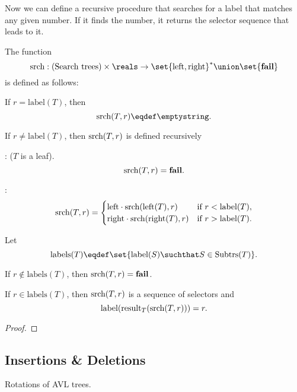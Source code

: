 Now we can define a recursive procedure that searches for a label that
matches any given number.  If it finds the number, it returns the
selector sequence that leads to it.

\begin{definition}

The function
\[
\srchtr{}: \text{(Search trees)} \times \reals \to \set{\leftsub{},\rightsub{}}^* \union \set{\textbf{fail}}
\]
is defined as follows:

If $r = \text{label}(T)$, then
\[
\srchtr{(T,r)} \eqdef \emptystring.
\]

If $r \neq \text{label}(T)$, then $\text{srch}(T,r)$ is defined recursively

: ($T$ is a leaf).
\[
\text{srch}(T,r) = \textbf{fail}.
\]

:
\[
\text{srch}(T,r) = \begin{cases} 
\text{left}\cdot \text{srch}(\text{left}(T),r) & \text{if $r < \text{label}(T)$},\\
\text{right}\cdot \text{srch}(\text{right}(T),r) & \text{if $r > \text{label}(T)$}.
\end{cases}
\]
\end{definition}

\begin{theorem}
Let
\[
\text{labels}(T) \eqdef \set{\text{label}(S) \suchthat S \in \subbrn{T}}.
\]

If $r \notin \text{labels}(T)$, then $\text{srch}(T,r) = \textbf{fail}$.  

If $r \in \text{labels}(T)$, then $\text{srch}(T,r)$ is a sequence of
selectors and
\[
\text{label}(\text{result}_{T}(\text{srch}(T,r))) = r.
\]
\end{theorem}

\begin{proof}


\end{proof}

\subsection{Insertions \& Deletions}

Rotations of AVL trees.


  \endinput
